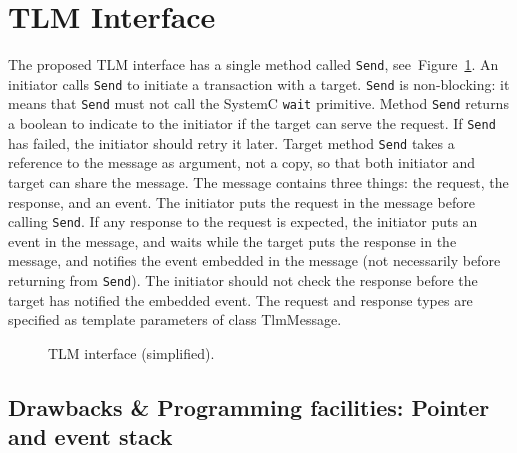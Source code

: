 \section{TLM Interface}
\label{tlm_interface}

The proposed TLM interface has a single method called \texttt{Send},
see~Figure~\ref{fig:interface1}. An initiator calls \texttt{Send} to
initiate a transaction with a target. \texttt{Send} is non-blocking:
it means that \texttt{Send} must not call the SystemC
\texttt{wait} primitive. Method \texttt{Send} returns a boolean to
indicate to the initiator if the target can serve the request. If
\texttt{Send} has failed, the initiator should retry it later. Target
method \texttt{Send} takes a reference to the message as argument, not
a copy, so that both initiator and target can share the message. The
message contains three things: the request, the response, and an
event. The initiator puts the request in the message before calling
\texttt{Send}. If any response to the request is expected, the
initiator puts an event in the message, and waits while the target
puts the response in the message, and notifies the event embedded in
the message (not necessarily before returning from \texttt{Send}).
The initiator should not check the response before the target has
notified the embedded event. The request and response types are
specified as template parameters of class TlmMessage.



\begin{figure}[h]
  \begin{center}
    
    \caption{\label{fig:interface1} TLM interface (simplified).}
  \end{center}
\end{figure}

\subsection{Drawbacks \& Programming facilities: Pointer and event stack}
\label{drawbacks_and_programming_facilities}

